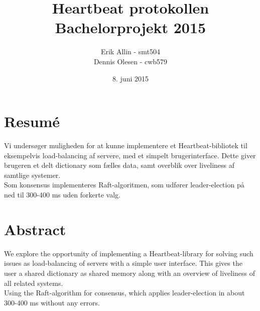 \documentclass[a4paper,12pt]{article}
\title{Heartbeat protokollen \\ Bachelorprojekt 2015}
\author{Erik Allin - smt504 \\ Dennis Olesen - cwb579}
\date{8. juni 2015}
\begin{document}
\maketitle
\newpage
\renewcommand*\contentsname{Indholdsfortegnelse}
\tableofcontents
\newpage
\clearpage

\section{Resumé}
Vi undersøger muligheden for at kunne implementere et Heartbeat-bibliotek til eksempelvis load-balancing af servere, med et simpelt brugerinterface. Dette giver brugeren et delt dictionary som fælles data, samt overblik over liveliness af samtlige systemer.
\\
Som konsensus implementeres Raft-algoritmen, som udfører leader-election på ned til 300-400 ms uden forkerte valg. 

\section{Abstract}
We explore the opportunity of implementing a Heartbeat-library for solving such issues as load-balancing of servers with a simple user interface. This gives the user a shared dictionary as shared memory along with an overview of liveliness of all related systems.
\\
Using the Raft-algorithm for consensus, which applies leader-election in about 300-400 ms without any errors.

\newpage
\end{document}
